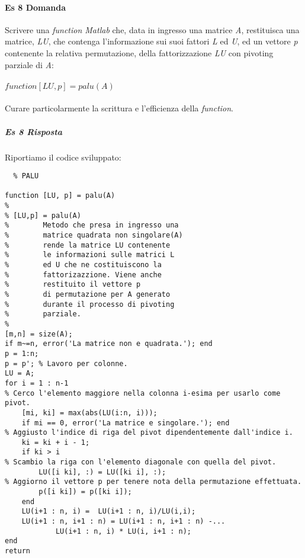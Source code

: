 \documentclass[a4paper]{report}
\begin{document}
\paragraph{Es 8 Domanda}
Scrivere una \emph{function Matlab} che, data in ingresso una matrice \emph{A}, restituisca una matrice, \emph{LU}, che contenga l'informazione sui suoi fattori \emph{L} ed \emph{U}, ed un vettore \emph{p} contenente la relativa permutazione, della fattorizzazione \emph{LU} con pivoting parziale di \emph{A}:\\\\
$function [LU,p] = palu(A)$\\\\Curare particolarmente la scrittura e l'efficienza della \emph{function}.
\subparagraph{Es 8 Risposta}
Riportiamo il codice sviluppato:\\
\begin{lstlisting}	% PALU

function [LU, p] = palu(A)
%
% [LU,p] = palu(A)
%        Metodo che presa in ingresso una 
%        matrice quadrata non singolare(A) 
%        rende la matrice LU contenente
%        le informazioni sulle matrici L
%        ed U che ne costituiscono la
%        fattorizazzione. Viene anche
%        restituito il vettore p 
%        di permutazione per A generato
%        durante il processo di pivoting
%        parziale.
%
[m,n] = size(A); 
if m~=n, error('La matrice non e quadrata.'); end
p = 1:n;
p = p'; % Lavoro per colonne.
LU = A;
for i = 1 : n-1
% Cerco l'elemento maggiore nella colonna i-esima per usarlo come pivot.
	[mi, ki] = max(abs(LU(i:n, i)));
	if mi == 0, error('La matrice e singolare.'); end
% Aggiusto l'indice di riga del pivot dipendentemente dall'indice i.
	ki = ki + i - 1;
	if ki > i
% Scambio la riga con l'elemento diagonale con quella del pivot.
		LU([i ki], :) = LU([ki i], :);
% Aggiorno il vettore p per tenere nota della permutazione effettuata.
		p([i ki]) = p([ki i]);
	end
	LU(i+1 : n, i) =  LU(i+1 : n, i)/LU(i,i);
	LU(i+1 : n, i+1 : n) = LU(i+1 : n, i+1 : n) -...
			LU(i+1 : n, i) * LU(i, i+1 : n);
end
return 
\end{lstlisting}
\end{document}
